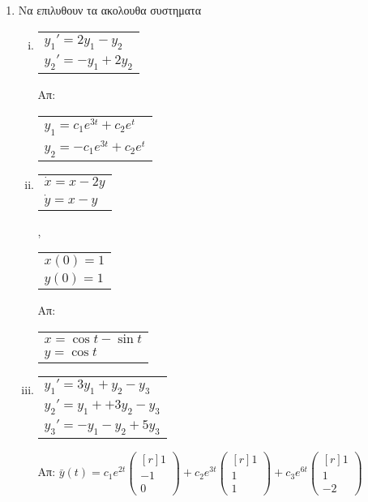 






\begin{center}
\end{center}

\vspace{\baselineskip}

\begin{enumerate}

\item Να επιλυθουν τα ακολουθα συστηματα

\begin{enumerate}[i)]
\item \begin{tabular}{l} $y_1'=2y_1-y_2$ \\ $y_2'=-y_1+2y_2$\end{tabular} \hfill Απ: \begin{tabular}{l} $y_1=c_1e^{3t}+c_2e^t$ \\ $y_2=-c_1e^{3t}+c_2e^t$\end{tabular}


\item \begin{tabular}{l} $\dot x=x-2y$ \\ $\dot y=x-y$\end{tabular}, \begin{tabular}{l} $x(0)=1$ \\ $y(0)=1$\end{tabular}\hfill Απ:  \begin{tabular}{l} $x=\cos t-\sin t$ \\ $y=\cos t$\end{tabular}

\item  \begin{tabular}{l} $y_1'=3y_1+y_2-y_3$ \\ $y_2'=y_1++3y_2-y_3$ \\
		$y_3'=-y_1-y_2+5y_3$\end{tabular}\hfill Απ: ${\bar{y}(t)=c_1e^{2t}\begin{pmatrix*}[r]
1\\-1\\0
\end{pmatrix*}+c_2e^{3t}\begin{pmatrix*}[r]
1\\1\\1
\end{pmatrix*}+c_3e^{6t}\begin{pmatrix*}[r]
1\\1\\-2
\end{pmatrix*}}$


\end{enumerate}
\end{enumerate}
